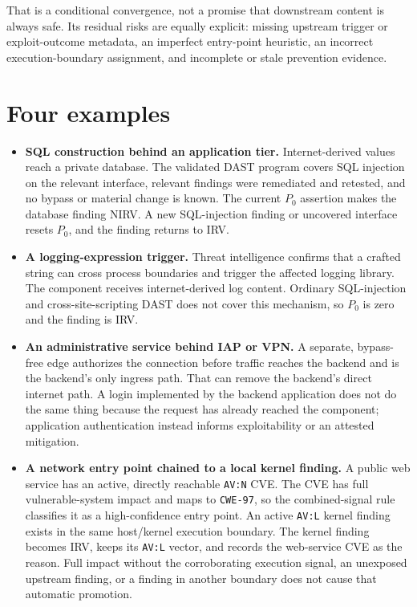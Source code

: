\documentclass[11pt]{article}
\newcommand{\code}[1]{\texttt{#1}}
\begin{document}
That is a conditional convergence, not a promise that downstream content is
always safe. Its residual risks are equally explicit: missing upstream trigger
or exploit-outcome metadata, an imperfect entry-point heuristic, an incorrect
execution-boundary assignment, and incomplete or stale prevention evidence.

\section*{Four examples}
\begin{itemize}[leftmargin=1.5em]
\item \textbf{SQL construction behind an application tier.}
  Internet-derived values reach a private database. The validated DAST program
  covers SQL injection on the relevant interface, relevant findings were
  remediated and retested, and no bypass or material change is known. The current
  $P_0$ assertion makes the database finding NIRV. A new SQL-injection finding or
  uncovered interface resets $P_0$, and the finding returns to IRV.

\item \textbf{A logging-expression trigger.}
  Threat intelligence confirms that a crafted string can cross process
  boundaries and trigger the affected logging library. The component receives
  internet-derived log content. Ordinary SQL-injection and cross-site-scripting
  DAST does not cover this mechanism, so $P_0$ is zero and the finding is IRV.

\item \textbf{An administrative service behind IAP or VPN.}
  A separate, bypass-free edge authorizes the connection before traffic reaches
  the backend and is the backend's only ingress path. That can remove the
  backend's direct internet path. A login implemented by the backend application
  does not do the same thing because the request has already reached the
  component; application authentication instead informs exploitability or an
  attested mitigation.

\item \textbf{A network entry point chained to a local kernel finding.}
  A public web service has an active, directly reachable \code{AV:N} CVE. The
  CVE has full vulnerable-system impact and maps to \code{CWE-97}, so the
  combined-signal rule classifies it as a high-confidence entry point. An active
  \code{AV:L} kernel finding exists in the same host/kernel execution boundary.
  The kernel finding becomes IRV, keeps its \code{AV:L} vector, and records the
  web-service CVE as the reason. Full impact without the corroborating execution
  signal, an unexposed upstream finding, or a finding in another boundary does
  not cause that automatic promotion.
\end{itemize}
\end{document}

